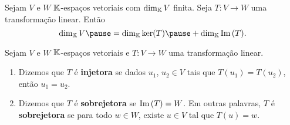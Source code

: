 \documentclass{beamer}
\begin{document}
    \begin{frame}
        \begin{teorema}
            Sejam $V$ e $W$ $\mathbb{K}$-espaços vetoriais \pause com $\dim_{\mathbb{K}}V$ finita. \pause Seja $T \colon V \to W$ uma transformação
            linear. \pause Então\pause
            \[
                \dim_\cp{K}V \pause = \dim_\cp{K}\ker(T) \pause + \dim_\cp{K}\im(T).
            \]
        \end{teorema}
    \end{frame}

    \begin{frame}
        \begin{definicao}
            Sejam $V$ e $W$ $\mathbb{K}$-espaços vetoriais \pause e $T \colon V \to W$ uma transformação linear.\pause
            \begin{enumerate}[label={\roman*})]
                \vspace*{.25cm}
                \item Dizemos que $T$ é \textbf{injetora} \pause se dados $u_1$, $u_2 \in V$ \pause tais que $T(u_1) = T(u_2)$, \pause
                    então $u_1 = u_2$. \pause

                \vspace{1cm}

                \item Dizemos que $T$ é \textbf{sobrejetora} \pause se ${\rm Im\,}(T) = W$. \pause Em outras palavras, \pause $T$ é
                    \textbf{sobrejetora} se para todo $w \in W$, \pause existe $u \in V$ tal que $T(u) = w$.
            \end{enumerate}
        \end{definicao}
    \end{frame}
\end{document}
